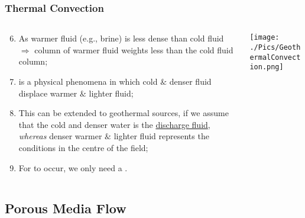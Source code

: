 \documentclass[10pt,compress,unknownkeysallowed]{beamer}
\begin{document}
\begin{frame}
 \frametitle{Thermal Convection}
  \begin{columns}
   \begin{column}[c]{0.45\linewidth}
    \begin{enumerate}[1.]\setcounter{enumi}{5} \scriptsize
       \item <1-> As warmer fluid (e.g., brine) is less dense than cold fluid $\Longrightarrow$ column of warmer fluid weights less than the cold fluid column;
       \item <2->  is a physical phenomena in which cold $\&$ denser fluid displace warmer $\&$ lighter fluid;
       \item <3-> This can be extended to geothermal sources, if we assume that the cold and denser water is the \underline{discharge fluid}, {\it whereas} denser warmer $\&$ lighter fluid represents the conditions in the centre of the field; 
       \item <4-> For  to occur, we only need a . 
    \end{enumerate}
   \end{column}
   \begin{column}[c]{0.55\linewidth}
     \begin{center}
        \texttt{[image: ./Pics/GeothermalConvection.png]}
     \end{center}
   \end{column}  
  \end{columns}
\end{frame}



\subsection{Porous Media Flow}
\end{document}
